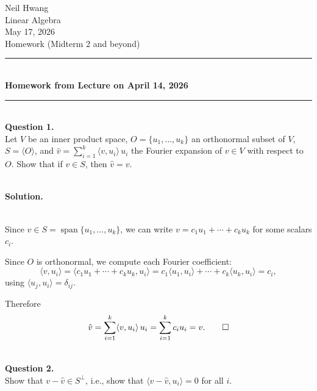 \documentclass{article}
\DeclareMathOperator{\spn}{span}
\newcommand{\ip}[2]{\langle #1, #2 \rangle}
\begin{document}
\begin{flushright}
Neil Hwang\\
Linear Algebra\\
May 17, 2026\\
Homework (Midterm 2 and beyond)\\
\end{flushright}


\bigskip
\begin{center}
\rule{0.5\textwidth}{1pt}\\[6pt]
\textbf{Homework from Lecture on April 14, 2026}\\[2pt]
\rule{0.5\textwidth}{1pt}
\end{center}
\bigskip

\hfill \break  $~\!\!$ \dotfill \medskip \\
\textbf{Question 1.}\\
Let $V$ be an inner product space, $O = \{u_1, \dots, u_k\}$ an orthonormal subset of $V$, $S = \langle O \rangle$, and $\hat{v} = \sum_{i=1}^{k} \ip{v}{u_i}\, u_i$ the Fourier expansion of $v \in V$ with respect to $O$. Show that if $v \in S$, then $\hat{v} = v$.

\noindent\\
\textbf{Solution.}\\
\quad\\
\begin{mdframed}[linewidth=1pt]
Since $v \in S = \spn\{u_1, \dots, u_k\}$, we can write $v = c_1 u_1 + \cdots + c_k u_k$ for some scalars $c_i$.

Since $O$ is orthonormal, we compute each Fourier coefficient:
\[
\ip{v}{u_i} = \ip{c_1 u_1 + \cdots + c_k u_k}{u_i} = c_1 \ip{u_1}{u_i} + \cdots + c_k \ip{u_k}{u_i} = c_i,
\]
using $\ip{u_j}{u_i} = \delta_{ij}$.

Therefore
\[
\hat{v} = \sum_{i=1}^{k} \ip{v}{u_i}\, u_i = \sum_{i=1}^{k} c_i u_i = v. \qed
\]
\end{mdframed}

\bigskip


\hfill \break  $~\!\!$ \dotfill \medskip \\
\textbf{Question 2.}\\
Show that $v - \hat{v} \in S^\perp$, i.e., show that $\ip{v - \hat{v}}{u_i} = 0$ for all $i$.
\end{document}
